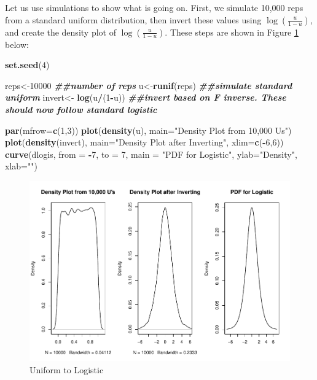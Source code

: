 \documentclass[
]{book}
\newenvironment{Shaded}{\begin{snugshade}}{\end{snugshade}}
\newcommand{\AttributeTok}[1]{\textcolor[rgb]{0.13,0.29,0.53}{#1}}
\newcommand{\DecValTok}[1]{\textcolor[rgb]{0.00,0.00,0.81}{#1}}
\newcommand{\DocumentationTok}[1]{\textcolor[rgb]{0.56,0.35,0.01}{\textbf{\textit{#1}}}}
\newcommand{\FunctionTok}[1]{\textcolor[rgb]{0.13,0.29,0.53}{\textbf{#1}}}
\newcommand{\NormalTok}[1]{#1}
\newcommand{\OtherTok}[1]{\textcolor[rgb]{0.56,0.35,0.01}{#1}}
\newcommand{\SpecialCharTok}[1]{\textcolor[rgb]{0.81,0.36,0.00}{\textbf{#1}}}
\newcommand{\StringTok}[1]{\textcolor[rgb]{0.31,0.60,0.02}{#1}}
\begin{document}
Let us use simulations to show what is going on. First, we simulate 10,000 reps from a standard uniform distribution, then invert these values using \(\log (\frac{u}{1-u})\), and create the density plot of \(\log (\frac{u}{1-u})\). These steps are shown in Figure \ref{fig:4-universe} below:

\begin{Shaded}
\begin{Highlighting}[]
\FunctionTok{set.seed}\NormalTok{(}\DecValTok{4}\NormalTok{)}

\NormalTok{reps}\OtherTok{\textless{}{-}}\DecValTok{10000} \DocumentationTok{\#\#number of reps}
\NormalTok{u}\OtherTok{\textless{}{-}}\FunctionTok{runif}\NormalTok{(reps) }\DocumentationTok{\#\#simulate standard uniform}
\NormalTok{invert}\OtherTok{\textless{}{-}} \FunctionTok{log}\NormalTok{(u}\SpecialCharTok{/}\NormalTok{(}\DecValTok{1}\SpecialCharTok{{-}}\NormalTok{u)) }\DocumentationTok{\#\#invert based on F inverse. These should now follow standard logistic}

\FunctionTok{par}\NormalTok{(}\AttributeTok{mfrow=}\FunctionTok{c}\NormalTok{(}\DecValTok{1}\NormalTok{,}\DecValTok{3}\NormalTok{))}
\FunctionTok{plot}\NormalTok{(}\FunctionTok{density}\NormalTok{(u), }\AttributeTok{main=}\StringTok{"Density Plot from 10,000 U\textquotesingle{}s"}\NormalTok{)}
\FunctionTok{plot}\NormalTok{(}\FunctionTok{density}\NormalTok{(invert), }\AttributeTok{main=}\StringTok{"Density Plot after Inverting"}\NormalTok{, }\AttributeTok{xlim=}\FunctionTok{c}\NormalTok{(}\SpecialCharTok{{-}}\DecValTok{6}\NormalTok{,}\DecValTok{6}\NormalTok{))}
\FunctionTok{curve}\NormalTok{(dlogis, }\AttributeTok{from =} \SpecialCharTok{{-}}\DecValTok{7}\NormalTok{, }\AttributeTok{to =} \DecValTok{7}\NormalTok{, }\AttributeTok{main =} \StringTok{"PDF for Logistic"}\NormalTok{, }\AttributeTok{ylab=}\StringTok{"Density"}\NormalTok{, }\AttributeTok{xlab=}\StringTok{""}\NormalTok{)}
\end{Highlighting}
\end{Shaded}

\begin{figure}
\centering
\includegraphics{bookdown-demo_files/figure-latex/4-universe-1.pdf}
\caption{\label{fig:4-universe}Uniform to Logistic}
\end{figure}
\end{document}
